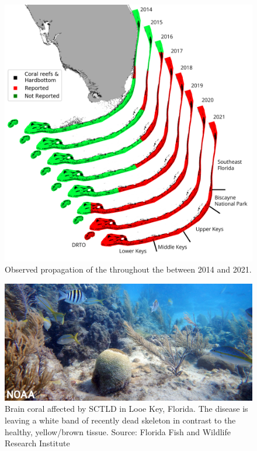 \begin{figure}
    \centering
    \includegraphics[width=\textwidth]{chapters/intro/figures/fig_sctld.png}
    \caption{Observed propagation of the  throughout the  between 2014 and 2021. }
    \label{intro:propagation}
\end{figure}

\begin{figure}
    \centering
    \includegraphics[width=\textwidth]{chapters/intro/figures/sctld.jpg}
    \caption{Brain coral affected by SCTLD in Looe Key, Florida. The disease is leaving a white band of recently dead skeleton in contrast to the healthy, yellow/brown tissue. Source: Florida Fish and Wildlife Research Institute}
    \label{intro:sctld}
\end{figure}


